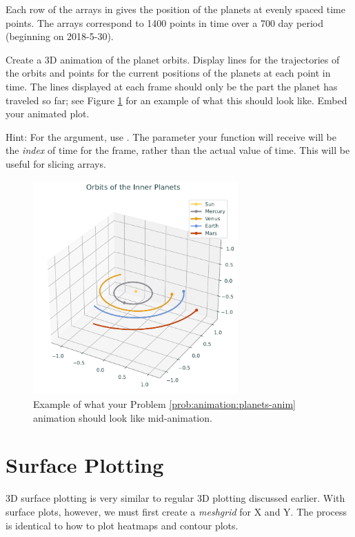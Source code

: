 \begin{problem}
\label{prob:animation:planets-anim}
Each row of the arrays in  gives the position of the planets at evenly spaced time points. The arrays correspond to 1400 points in time over a 700 day period (beginning on 2018-5-30).

Create a 3D animation of the planet orbits.
Display lines for the trajectories of the orbits and points for the current positions of the planets at each point in time.
The lines displayed at each frame should only be the part the planet has traveled so far; see Figure \ref{animation:planets-midanimation} for an example of what this should look like.
Embed your animated plot.

Hint: For the  argument, use .
The parameter your  function will receive will be the \emph{index} of time for the frame, rather than the actual value of time.
This will be useful for slicing arrays.
\end{problem}
\begin{figure}[h]
\centering
\includegraphics[width=0.7\textwidth]{figures/orbits-midanimation.pdf}
\caption{Example of what your Problem \ref{prob:animation:planets-anim} animation should look like mid-animation.}
\label{animation:planets-midanimation}
\end{figure}

\section*{Surface Plotting}
3D surface plotting is very similar to regular 3D plotting discussed earlier.
With surface plots, however, we must first create a \textit{meshgrid} for X and Y.
The process is identical to how to plot heatmaps and contour plots.

